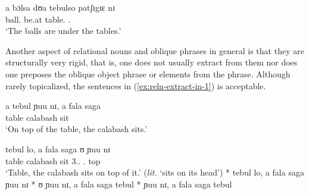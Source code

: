 \begin{exe}
\begin{exe}
\begin{exe}
{\begin{exe}
\begin{exe}
\begin{exe}
\begin{exe}
\begin{exe}
\begin{exe}
\begin{exe}
\ea\label{ex:reln-plu-stomach}
\gll a bɔlsa dʊa tebulso patʃɪgɪɛ nɪ  \\
{\art} ball.{\pl}  be.at  table.{\pl}  {\reln .\pl} {\postp}\\
\glt `The balls are under the tables.'
\z




Another aspect of relational nouns and oblique phrases in general is that
they are structurally very rigid, that is, one does not usually extract from
them nor does
one preposes the oblique object phrase or elements from the phrase. Although
rarely
topicalized, the
sentences in  (\ref{ex:reln-extract-in-1})  is acceptable. 


\ea\label{ex:reln-extract}
\begin{xlist}
\ea\label{ex:reln-extract-in-1}

\gll  a tebul  ɲuu nɪ, a fala saga  \\
 {\art } table {\reln} {\postp}  {\art } calabash sit\\
\glt `On top of the table, the calabash sits.'

 \ex\label{ex:reln-extract-in-2}
\gll  tebul lo, a fala saga ʊ   ɲuu nɪ  \\
 table {\foc} {\art} calabash sit {3.\sg.\poss} {\reln. top} {\postp}   \\
\glt `Table, the calabash sits on top of it.' ({\it lit.} `sits on its head')
 \ex\label{ex:reln-extract-out-3}
* tebul lo, a fala saga  ɲuu nɪ
 \ex\label{ex:reln-extract-out-1}
 * ʊ   ɲuu nɪ, a fala saga tebul
 \ex\label{ex:reln-extract-out-2}
 *   ɲuu nɪ, a fala saga tebul

 \z
\z
\z


\end{xlist}
\end{exe}
\end{exe}
\end{exe}
\end{exe}
\end{exe}
\end{exe}
\end{exe}}
\end{exe}
\end{exe}
\end{exe}
